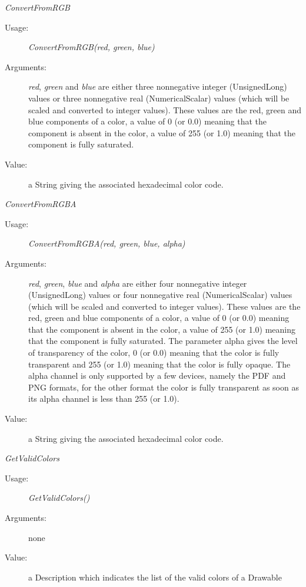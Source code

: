\begin{description}
\begin{description}
  \item \textit{ConvertFromRGB}
    \begin{description}
    \item[Usage:] \textit{ConvertFromRGB(red, green, blue)}
    \item[Arguments:] \textit{red}, \textit{green} and \textit{blue} are either three nonnegative integer (UnsignedLong) values or three nonnegative real (NumericalScalar) values (which will be scaled and converted to integer values). These values are the red, green and blue components of a color, a value of 0 (or 0.0) meaning that the component is absent in the color, a value of 255 (or 1.0) meaning that the component is fully saturated.
    \item[Value:] a String giving the associated hexadecimal color code.
    \end{description}
    \bigskip
  \item \textit{ConvertFromRGBA}
    \begin{description}
    \item[Usage:] \textit{ConvertFromRGBA(red, green, blue, alpha)}
    \item[Arguments:] \textit{red}, \textit{green}, \textit{blue} and \textit{alpha} are either four nonnegative integer (UnsignedLong) values or four nonnegative real (NumericalScalar) values (which will be scaled and converted to integer values). These values are the red, green and blue components of a color, a value of 0 (or 0.0) meaning that the component is absent in the color, a value of 255 (or 1.0) meaning that the component is fully saturated. The parameter alpha gives the level of transparency of the color, 0 (or 0.0) meaning that the color is fully transparent and 255 (or 1.0) meaning that the color is fully opaque. The alpha channel is only supported by a few devices, namely the PDF and PNG formats, for the other format the color is fully transparent as soon as its alpha channel is less than 255 (or 1.0).
    \item[Value:] a String giving the associated hexadecimal color code.
    \end{description}
    \bigskip
  \item \textit{GetValidColors}
    \begin{description}
    \item[Usage:] \textit{GetValidColors()}
    \item[Arguments:] none
    \item[Value:] a Description which indicates the list of the valid colors of a Drawable

\end{description}
\end{description}
\end{description}
